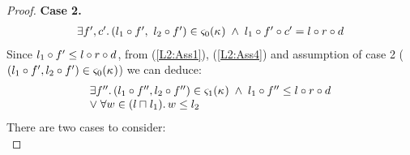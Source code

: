 \begin{lemma}[]
\begin{proof}
%
%
%
%
\noindent\textbf{Case 2.} 
%
\[
\begin{array}{l}
		\exists f', c'.\, (l_1 \circ f',\ l_2 \circ f') \in \varsigma_{0}(\kappa_{}) \;\land\; l_1 \circ f' \circ c' = l \circ r \circ d
\end{array}
\]
%
Since $l_1 \circ f' \leq l \circ r \circ d$, from (\ref{L2:Ass1}), (\ref{L2:Ass4}) and assumption of case 2 ($(l_1 \circ f', l_2  \circ f') \in \varsigma_{0}(\kappa_{})$)  we can deduce:
\begin{align}
\begin{array}{l}
	\exists f''.\, (l_1 \circ f'', l_2 \circ f'') \in \varsigma_{1}(\kappa_{}) \;\land\; l_1 \circ f'' \leq l \circ r \circ d\\
	\lor\; \forall w \in (l \sqcap_{} l_1).\, w \leq l_2
\end{array} \nonumber
\end{align}
%
There are two cases to consider:\\


\end{proof}
\end{lemma}
